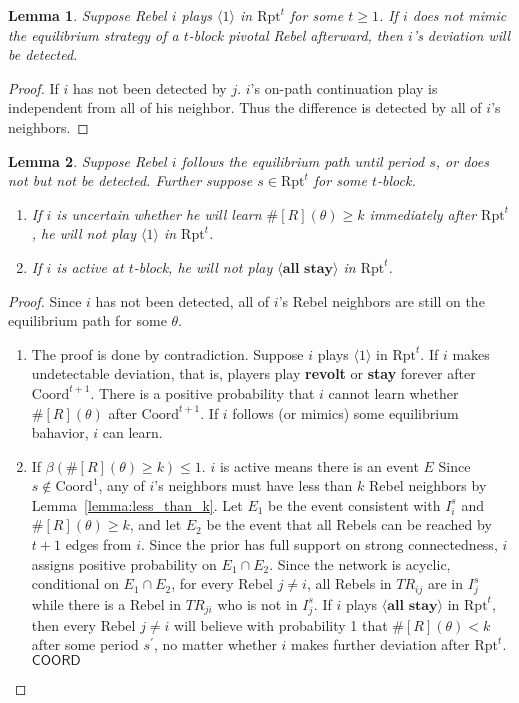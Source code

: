 \documentclass[12pt,letter]{article}
\newcommand{\Kappa}{\mathrm{Coord}}
\newcommand{\Omicron}{\mathrm{Rpt}}
\newtheorem{lemma}{Lemma}[section]
\theoremstyle{definition}
\theoremstyle{remark}
\theoremstyle{claim}
\begin{document}
\begin{lemma}Suppose Rebel $i$ plays $\langle 1 \rangle$ in $\Omicron^t$ for some $t\geq 1$. If $i$ does not mimic the equilibrium strategy of a $t$-block pivotal Rebel afterward, then $i$'s deviation will be detected.
\end{lemma}
\begin{proof}
If $i$ has not been detected by $j$. $i$'s on-path continuation play is independent from all of his neighbor. Thus the difference is detected by all of $i$'s neighbors.
\end{proof}

\begin{lemma}Suppose Rebel $i$ follows the equilibrium path until period $s$, or does not but not be detected. Further suppose $s\in \Omicron^t$ for some $t$-block.
\begin{enumerate}
\item If $i$ is uncertain whether he will learn $\#[R](\theta)\geq k$ immediately after $\Omicron^t$, he will not play $\langle 1 \rangle$ in $\Omicron^t$.
\item If $i$ is active at $t$-block, he will not play $\langle \textbf{all stay} \rangle$ in $\Omicron^t$. 
\end{enumerate}   
\end{lemma}
\begin{proof}
Since $i$ has not been detected, all of $i$'s Rebel neighbors are still on the equilibrium path for some $\theta$. 
\begin{enumerate}
\item The proof is done by contradiction. Suppose $i$ plays $\langle 1 \rangle$ in $\Omicron^t$. If $i$ makes undetectable deviation, that is, players play \textbf{revolt} or \textbf{stay} forever after $\Kappa^{t+1}$. There is a positive probability that $i$ cannot learn whether $\#[R](\theta)$ after $\Kappa^{t+1}$. If $i$ follows (or mimics) some equilibrium bahavior, $i$ can learn. 
\item If $\beta(\#[R](\theta)\geq k)\leq 1$. $i$ is active means there is an event $E$ Since $s\not\in \Kappa^1$, any of $i$'s neighbors must have less than $k$ Rebel neighbors by Lemma~\ref{lemma:less_than_k}. Let $E_1$ be the event consistent with $I^s_i$ and $\#[R](\theta)\geq k$, and let $E_2$ be the event that all Rebels can be reached by $t+1$ edges from $i$. Since the prior has full support on strong connectedness, $i$ assigns positive probability on $E_1\cap E_2$. Since the network is acyclic, conditional on $E_1\cap E_2$, for every Rebel $j\neq i$, all Rebels in $TR_{ij}$ are in $I^s_j$ while there is a Rebel in $TR_{ji}$ who is not in $I^s_j$. If $i$ plays $\langle \textbf{all stay} \rangle$ in $\Omicron^t$, then every Rebel $j\neq i$ will believe with probability 1 that $\#[R](\theta)<k$ after some period $s^{'}$, no matter whether $i$ makes further deviation after $\Omicron^t$. $\mathsf{COORD}$
\end{enumerate}
\end{proof}
\end{document}
